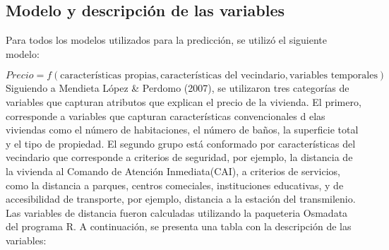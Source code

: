 \documentclass[
  11pt,
  letterpaper,
]{article}
\begin{document}
\hypertarget{modelo-y-descripciuxf3n-de-las-variables}{%
\subsection{Modelo y descripción de las variables}\label{modelo-y-descripciuxf3n-de-las-variables}}

Para todos los modelos utilizados para la predicción, se utilizó el siguiente modelo:

\[
Precio= f(\text{características propias}, \text{características del vecindario},\text{variables temporales})
\]
Siguiendo a Mendieta López \& Perdomo (2007), se utilizaron tres categorías de variables que capturan atributos que explican el precio de la vivienda. El primero, corresponde a variables que capturan características convencionales d elas viviendas como el número de habitaciones, el número de baños, la superficie total y el tipo de propiedad. El segundo grupo está conformado por características del vecindario que corresponde a criterios de seguridad, por ejemplo, la distancia de la vivienda al Comando de Atención Inmediata(CAI), a criterios de servicios, como la distancia a parques, centros comeciales, instituciones educativas, y de accesibilidad de transporte, por ejemplo, distancia a la estación del transmilenio. Las variables de distancia fueron calculadas utilizando la paqueteria Osmadata del programa R. A continuación, se presenta una tabla con la descripción de las variables:
\end{document}
